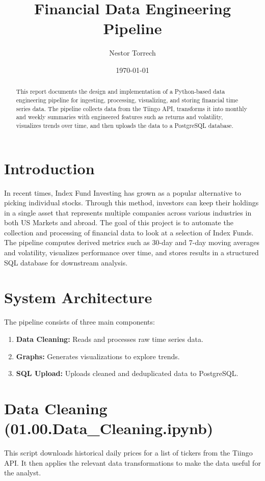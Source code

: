\documentclass[12pt]{article}
\title{Financial Data Engineering Pipeline}
\author{Nestor Torrech}
\date{\today}
\begin{document}
\maketitle

\begin{abstract}
This report documents the design and implementation of a Python-based data engineering pipeline for ingesting, processing, visualizing, and storing financial time series data. The pipeline collects data from the Tiingo API, transforms it into monthly and weekly summaries with engineered features such as returns and volatility, visualizes trends over time, and then uploads the data to a PostgreSQL database.
\end{abstract}

\section{Introduction}
In recent times, Index Fund Investing has grown as a popular alternative to picking individual stocks. Through this method, investors can keep their holdings in a single asset that represents multiple companies across various industries in both US Markets and abroad. The goal of this project is to automate the collection and processing of financial data to look at a selection of Index Funds. The pipeline computes derived metrics such as 30-day and 7-day moving averages and volatility, visualizes performance over time, and stores results in a structured SQL database for downstream analysis.

\section{System Architecture}
The pipeline consists of three main components:
\begin{enumerate}
\item \textbf{Data Cleaning:} Reads and processes raw time series data.
\item \textbf{Graphs:} Generates visualizations to explore trends.
\item \textbf{SQL Upload:} Uploads cleaned and deduplicated data to PostgreSQL.
\end{enumerate}

\section{Data Cleaning (01.00.Data\_Cleaning.ipynb)}
This script downloads historical daily prices for a list of tickers from the Tiingo API. It then applies the relevant data transformations to make the data useful for the analyst.
\end{document}

